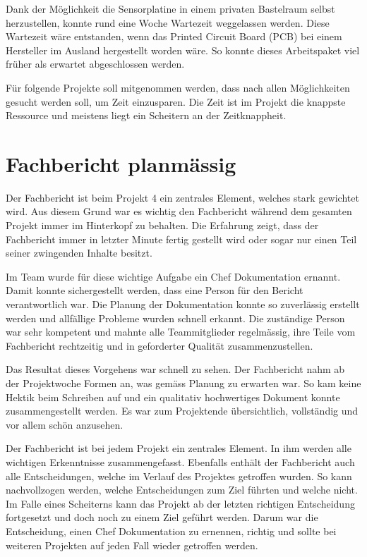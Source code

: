 Dank der M\"oglichkeit  die Sensorplatine in einem  privaten Bastelraum selbst
herzustellen,  konnte  rund  eine Woche  Wartezeit  weggelassen  werden. Diese
Wartezeit w\"are  entstanden, wenn das  Printed Circuit Board (PCB)  bei einem
Hersteller im Ausland hergestellt worden w\"are. So konnte dieses Arbeitspaket
viel fr\"uher als erwartet abgeschlossen werden.

F\"ur   folgende   Projekte  soll   mitgenommen   werden,   dass  nach   allen
M\"oglichkeiten  gesucht werden  soll, um  Zeit einzusparen. Die  Zeit ist  im
Projekt  die  knappste Ressource  und  meistens  liegt  ein Scheitern  an  der
Zeitknappheit.

\section{Fachbericht planm\"assig}
\label{sec:reportAsPlanned}

Der  Fachbericht ist  beim  Projekt  4 ein  zentrales  Element, welches  stark
gewichtet wird. Aus diesem Grund war  es wichtig den Fachbericht w\"ahrend dem
gesamten Projekt  immer im Hinterkopf  zu behalten. Die Erfahrung  zeigt, dass
der Fachbericht  immer in letzter Minute  fertig gestellt wird oder  sogar nur
einen Teil seiner zwingenden Inhalte besitzt.

Im  Team   wurde  f\"ur   diese  wichtige   Aufgabe  ein   Chef  Dokumentation
ernannt. Damit  konnte  sichergestellt  werden,  dass eine  Person  f\"ur  den
Bericht   verantwortlich  war. Die   Planung  der   Dokumentation  konnte   so
zuverl\"assig  erstellt  werden  und   allf\"allige  Probleme  wurden  schnell
erkannt.   Die  zust\"andige  Person  war   sehr  kompetent  und  mahnte  alle
Teammitglieder regelm\"assig,  ihre Teile  vom Fachbericht rechtzeitig  und in
geforderter Qualit\"at zusammenzustellen.

Das Resultat  dieses Vorgehens war  schnell zu sehen. Der Fachbericht  nahm ab
der Projektwoche Formen an, was gem\"ass Planung zu erwarten war. So kam keine
Hektik  beim Schreiben  auf und  ein qualitativ  hochwertiges Dokument  konnte
zusammengestellt werden. Es war zum Projektende \"ubersichtlich, vollst\"andig
und vor allem sch\"on anzusehen.

Der  Fachbericht  ist   bei  jedem  Projekt  ein   zentrales  Element. In  ihm
werden  alle wichtigen  Erkenntnisse zusammengefasst. Ebenfalls  enth\"alt der
Fachbericht  auch  alle  Entscheidungen,   welche  im  Verlauf  des  Projektes
getroffen wurden. So kann nachvollzogen werden, welche Entscheidungen zum Ziel
f\"uhrten und welche nicht. Im Falle eines  Scheiterns kann das Projekt ab der
letzten  richtigen  Entscheidung  fortgesetzt  und doch  noch  zu  einem  Ziel
gef\"uhrt  werden. Darum war  die  Entscheidung, einen  Chef Dokumentation  zu
ernennen,  richtig und  sollte bei  weiteren Projekten  auf jeden  Fall wieder
getroffen werden.

